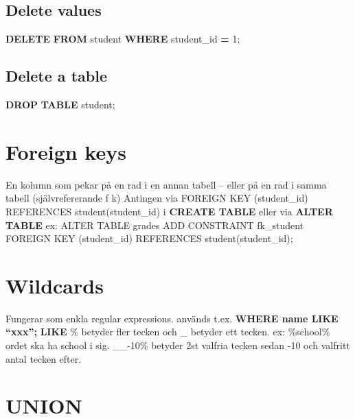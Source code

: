 \documentclass[
]{article}
\newenvironment{Shaded}{\begin{snugshade}}{\end{snugshade}}
\newcommand{\DecValTok}[1]{\textcolor[rgb]{0.00,0.00,0.81}{#1}}
\newcommand{\KeywordTok}[1]{\textcolor[rgb]{0.13,0.29,0.53}{\textbf{#1}}}
\newcommand{\NormalTok}[1]{#1}
\newcommand{\OperatorTok}[1]{\textcolor[rgb]{0.81,0.36,0.00}{\textbf{#1}}}
\begin{document}
\subsection{Delete values}\label{delete-values}

\begin{Shaded}
\begin{Highlighting}[]
\KeywordTok{DELETE} \KeywordTok{FROM}\NormalTok{ student}
\KeywordTok{WHERE}\NormalTok{ student\_id }\OperatorTok{=} \DecValTok{1}\NormalTok{;}
\end{Highlighting}
\end{Shaded}

\subsection{Delete a table}\label{delete-a-table}

\begin{Shaded}
\begin{Highlighting}[]
\KeywordTok{DROP} \KeywordTok{TABLE}\NormalTok{ student;}
\end{Highlighting}
\end{Shaded}

\section{Foreign keys}\label{foreign-keys}

En kolumn som pekar på en rad i en annan tabell -- eller på en rad i
samma tabell (självrefererande f k) Antingen via FOREIGN KEY
(student\_id) REFERENCES student(student\_id) i \textbf{CREATE TABLE}
eller via \textbf{ALTER TABLE} ex: ALTER TABLE grades ADD CONSTRAINT
fk\_student FOREIGN KEY (student\_id) REFERENCES student(student\_id);

\section{Wildcards}\label{wildcards}

Fungerar som enkla regular expressions. används t.ex. \textbf{WHERE name
LIKE ``xxx'';} \textbf{LIKE} \% betyder fler tecken och \_ betyder ett
tecken. ex: \%school\% ordet ska ha school i sig. \_\_-10\% betyder 2st
valfria tecken sedan -10 och valfritt antal tecken efter.

\section{UNION}\label{union}
\end{document}
